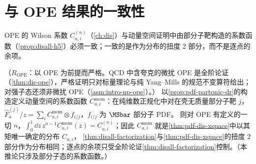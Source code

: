 \section{与 OPE 结果的一致性}\label{sec:disall-consistency}

OPE 的 Wilson 系数 $C^{(n)}_{a,i}$（\cref{ch:dis}）与动量空间证明中由部分子靶构造的系数函数（\cref{prop:disall-h5}）必须一致；一致的是作为分布的扭度 2 部分，而不是逐点的余项。

\begin{corollary}\label{cor:disall-consistency}
（$R_{\mathrm{OPE}}$：以 OPE 为前提而严格。QCD 中含夸克的微扰 OPE 是全阶论证（\cref{thm:dis-ope}），严格证明只对标量理论与纯 Yang--Mills 的规范不变算符给出；对强子态还须非微扰 OPE（\cref{asm:intro-np-ope}）。）
以\cref{prop:pdf-partonic-dr}的构造定义动量空间的系数函数 $C^{\mathrm{mom}}_{a,i}$：在纯维数正规化中对在壳无质量部分子靶 $j$，$\hat F^{(j)}_a/z=\sum_iC^{\mathrm{mom}}_{a,i}\otimes f_{i/j}$，$f_{i/j}$ 为 $\MSbar$ 部分子 PDF。
则对 OPE 有定义的一切 $n$，$\int_0^1\dd z\,z^{n-1}C^{\mathrm{mom}}_{a,i}(z)=C^{(n)}_{a,i}$；因此 $C^{\mathrm{mom}}_{a,i}$ 就是\cref{thm:pdf-dis-xspace}中以其矩唯一确定的分布 $C_{a,i}$，
\cref{thm:disall-factorization}与\cref{thm:pdf-dis-xspace}的扭度 2 部分作为分布相同；逐点的余项只受全阶论证\cref{thm:disall-factorization}控制。（本推论只涉及部分子态的系数函数。）
\end{corollary}

